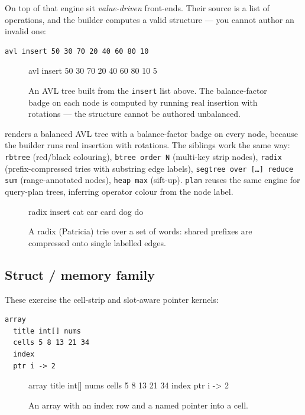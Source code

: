 On top of that engine sit \emph{value-driven} front-ends. Their source is a list
of operations, and the builder computes a valid structure --- you cannot author an
invalid one:

\begin{lstlisting}[language=triton]
avl insert 50 30 70 20 40 60 80 10
\end{lstlisting}

\begin{figure}[htbp]
  \centering
\begin{triton}
avl insert 50 30 70 20 40 60 80 10 5
\end{triton}
  \caption{An AVL tree built from the \texttt{insert} list above.
The balance-factor badge on each node is computed by running real insertion with
rotations --- the structure cannot be authored unbalanced.}
\end{figure}

\noindent renders a balanced AVL tree with a balance-factor badge on every node,
because the builder runs real insertion with rotations. The siblings work the
same way: \texttt{rbtree} (red/black colouring), \texttt{btree order N} (multi-key
strip nodes), \texttt{radix} (prefix-compressed tries with substring edge labels),
\texttt{segtree over [\dots] reduce sum} (range-annotated nodes), \texttt{heap max}
(sift-up). \texttt{plan} reuses the same engine for query-plan trees, inferring
operator colour from the node label.

\begin{figure}[htbp]
  \centering
\begin{triton}
radix insert cat car card dog do
\end{triton}
  \caption{A radix (Patricia) trie over a set of words: shared
prefixes are compressed onto single labelled edges.}
\end{figure}

\subsection{Struct / memory family}

These exercise the cell-strip and slot-aware pointer kernels:

\begin{lstlisting}[language=triton]
array
  title int[] nums
  cells 5 8 13 21 34
  index
  ptr i -> 2
\end{lstlisting}

\begin{figure}[htbp]
  \centering
\begin{triton}
array
  title int[] nums
  cells 5 8 13 21 34
  index
  ptr i -> 2
\end{triton}
  \caption{An array with an index row and a named pointer into
a cell.}
\end{figure}

